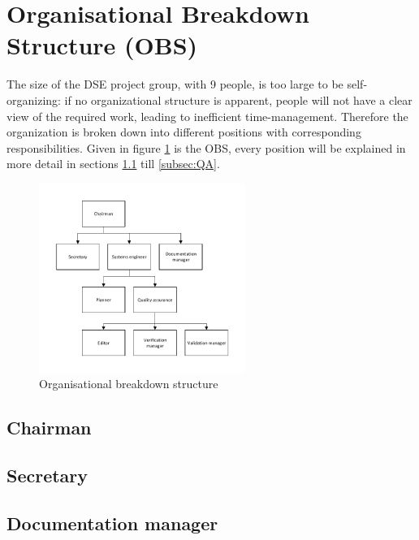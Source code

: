 \section{Organisational Breakdown Structure (OBS)}\label{cha:OBS}
The size of the DSE project group, with 9 people, is too large to be self-organizing: if no organizational structure is apparent, people will not have a clear view of the required work, leading to inefficient time-management. Therefore the organization is broken down into different positions with corresponding responsibilities. Given in figure \ref{fig:OBS} is the OBS, every position will be explained in more detail in sections \ref{subsec:Chairman} till \ref{subsec:QA}.

\begin{figure}[h]
\centering
\includegraphics[width=0.6\textwidth]{./Figure/OBS.pdf}
\caption{Organisational breakdown structure} \label{fig:OBS}
\end{figure}

\subsection{Chairman}\label{subsec:Chairman}


\subsection{Secretary}\label{subsec:Secretary}


\subsection{Documentation manager}\label{subsec:D_and_A}



